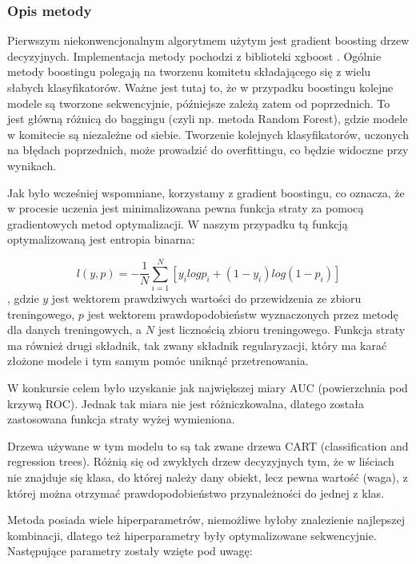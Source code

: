 \documentclass[12pt]{article}
\begin{document}
\subsubsection{Opis metody}

Pierwszym niekonwencjonalnym algorytmem użytym jest gradient boosting drzew decyzyjnych. Implementacja metody pochodzi z biblioteki xgboost \cite{xgboost}. Ogólnie metody boostingu polegają na tworzenu komitetu składającego się z wielu słabych klasyfikatorów. Ważne jest tutaj to, że w przypadku boostingu kolejne modele są tworzone sekwencyjnie, późniejsze zależą zatem od poprzednich. To jest główną różnicą do baggingu (czyli np. metoda Random Forest), gdzie modele w komitecie są niezależne od siebie. Tworzenie kolejnych klasyfikatorów, uczonych na błędach poprzednich, może prowadzić do overfittingu, co będzie widoczne przy wynikach.

Jak było wcześniej wspomniane, korzystamy z gradient boostingu, co oznacza, że w procesie uczenia jest minimalizowana pewna funkcja straty za pomocą gradientowych metod optymalizacji. W naszym przypadku tą funkcją optymalizowaną jest entropia binarna:

\begin{equation}
    l(y, p) = -\frac{1}{N} \sum_{i = 1}^{N} \left[ y_i log p_i + (1 - y_i) log (1 - p_i) \right]
\end{equation},
gdzie $y$ jest wektorem prawdziwych wartości do przewidzenia ze zbioru treningowego, $p$ jest wektorem prawdopodobieństw wyznaczonych przez metodę dla danych treningowych, a $N$ jest licznością zbioru treningowego. Funkcja straty ma również drugi składnik, tak zwany składnik regularyzacji, który ma karać złożone modele i tym samym pomóc uniknąć przetrenowania.

W konkursie celem było uzyskanie jak największej miary AUC (powierzchnia pod krzywą ROC). Jednak tak miara nie jest różniczkowalna, dlatego została zastosowana funkcja straty wyżej wymieniona. 

Drzewa używane w tym modelu to są tak zwane drzewa CART (classification and regression trees). Różnią się od zwykłych drzew decyzyjnych tym, że w liściach nie znajduje się klasa, do której należy dany obiekt, lecz pewna wartość (waga), z której można otrzymać prawdopodobieństwo przynależności do jednej z klas.

Metoda posiada wiele hiperparametrów, niemożliwe byłoby znalezienie najlepszej kombinacji, dlatego też hiperparametry były optymalizowane sekwencyjnie. Następujące parametry zostały wzięte pod uwagę:
\end{document}
